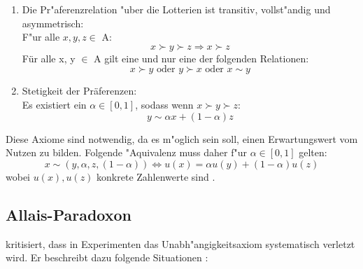 \documentclass[11pt]{article}
\begin{document}
\begin{itemize}
\begin{enumerate}
    
  \item Die Pr"aferenzrelation "uber die Lotterien ist transitiv, vollst"andig und asymmetrisch:\\
    F"ur alle $x, y, z \in$ A:
      \begin{equation}
      \label{eq:1}
     x \succ y \succ z \Rightarrow x \succ z \tag{Transitivit"at}
    \end{equation}
    F\"ur alle x, y $\in$ A gilt eine und nur eine der folgenden Relationen:
    \begin{equation}
      \label{eq:2}
     x \succ y \text{ oder } y \succ x \text{ oder } x \sim y \tag{Vollst"andigkeit  \& Asymmetrie}
    \end{equation}
  \item Stetigkeit der Pr\"aferenzen:\\
    Es existiert ein $\alpha \in [0,1]$, sodass wenn $x \succ y \succ z$:
    \begin{equation}
      \label{eq:3}
      y \sim \alpha x + (1-\alpha) z \tag{Stetigkeit}
    \end{equation}
  \end{enumerate}
\end{itemize}

Diese Axiome sind notwendig, da es m"oglich sein soll, einen Erwartungswert vom Nutzen zu bilden. Folgende "Aquivalenz muss daher f"ur $\alpha \in [0,1]$ gelten: 
\begin{equation}
  \label{eq:5}
  x \sim (y, \alpha, z, (1-\alpha)) \Leftrightarrow u(x) = \alpha u(y) + (1-\alpha)u(z) 
\end{equation}
wobei $u(x),u(z)$ konkrete Zahlenwerte sind \parencite[siehe ][S. 190f.]{rieck2012spieltheorie}.

\subsection{Allais-Paradoxon}
\label{sec:allais-paradoxon}

\textcite{allais_paradox} kritisiert, dass in Experimenten das Unabh"angigkeitsaxiom systematisch verletzt wird. Er beschreibt dazu folgende Situationen \parencite[S. 527]{allais_paradox}: 
\end{document}
